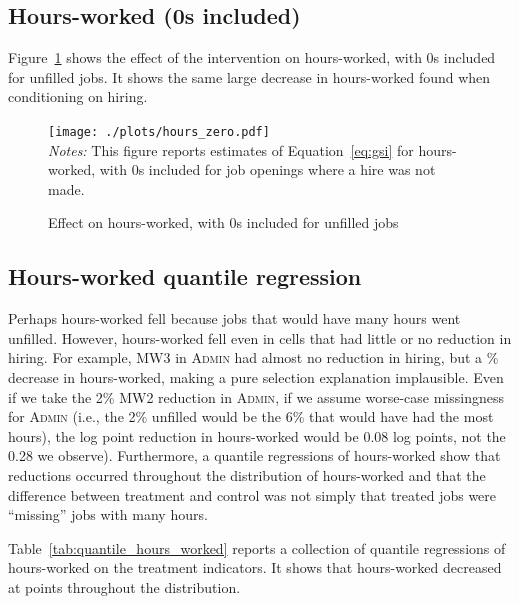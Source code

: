 \documentclass[AER]{AEA}
\newcommand{\admin}{\textsc{Admin}}
\begin{document}
\subsection{Hours-worked (0s included)} \label{sec:hours_worked_zero}

Figure~\ref{fig:all_new_hours_zero} shows the effect of the intervention on hours-worked, with 0s included for unfilled jobs. 
It shows the same large decrease in hours-worked found when conditioning on hiring. 

\begin{figure}[h!]
  \caption{Effect on hours-worked, with 0s included for unfilled jobs} \label{fig:all_new_hours_zero}
  \centering
  \begin{minipage}{0.99\textwidth}
    \texttt{[image: ./plots/hours\_zero.pdf]}
{\footnotesize \\
  \emph{Notes:} This figure reports estimates of Equation~\ref{eq:gsi} for hours-worked, with $0$s included for job openings where a hire was not made. 
}
\end{minipage} 
\end{figure}

\subsection{Hours-worked quantile regression} \label{sec:why_hours_fell}
Perhaps hours-worked fell because jobs that would have many hours went unfilled.
However, hours-worked fell even in cells that had little or no reduction in hiring.
For example, MW3 in \admin{} had almost no reduction in hiring, but a \ADMINThreeloghourspctchange{}\% decrease in hours-worked, making a pure selection explanation implausible.
Even if we take the 2\% MW2 reduction in \admin{}, if we assume worse-case missingness for \admin{} (i.e., the 2\% unfilled would be the 6\% that would have had the most hours), the log point reduction in hours-worked would be 0.08 log points, not the 0.28 we observe).  
Furthermore, a quantile regressions of hours-worked show that reductions occurred throughout the distribution of hours-worked and that the difference between treatment and control was not simply that treated jobs were ``missing'' jobs with many hours.

Table~\ref{tab:quantile_hours_worked} reports a collection of quantile regressions of hours-worked on the treatment indicators.
It shows that hours-worked decreased at points throughout the distribution.
\end{document}
